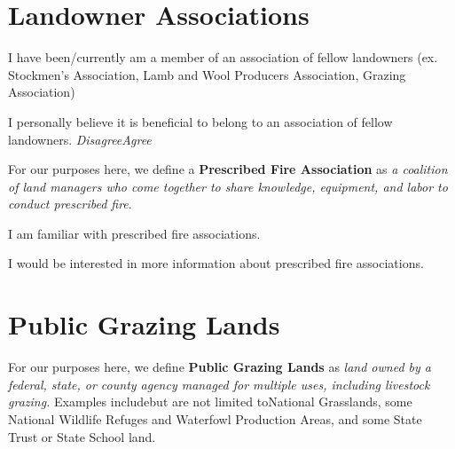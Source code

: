 \documentclass[
  english,
  checkmode = fill,
  ]{sdapsclassic}
\begin{document}
\begin{sloppypar}
\begin{questionnaire}
    
\section{Landowner Associations}
    
    \begin{choicequestion}[cols=4]{I have been/currently am a member of an association of fellow landowners (ex. Stockmen's Association, Lamb and Wool Producers Association, Grazing Association)}

    \end{choicequestion}

     \begin{markgroup}{I personally believe it is beneficial to belong to an association of fellow landowners.}
      \markline{ }
 {\emph{Disagree}}{\emph{Agree}~~}~{}~{}
      \end{markgroup}

For our purposes here, we define a \textbf{Prescribed Fire Association} as \emph{a coalition of land managers who come together to share knowledge, equipment, and labor to conduct prescribed fire}. 
    
    \begin{choicequestion}[cols=4]{I am familiar with prescribed fire associations.}
    \end{choicequestion}    
    
    \begin{choicequestion}[cols=4]{I would be interested in more information about prescribed fire associations.}
    \end{choicequestion}    
    
\newpage 

 \section{Public Grazing Lands}
    
For our purposes here, we define \textbf{Public Grazing Lands} as \emph{land owned by a federal, state, or county agency managed for multiple uses, including livestock grazing.} 
Examples include\textemdash but are not limited to\textemdash National Grasslands, some National Wildlife Refuges and Waterfowl Production Areas, and some State Trust or State School land. 
    

\end{questionnaire}
\end{sloppypar}
\end{document}
